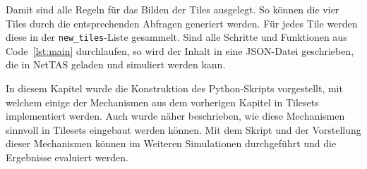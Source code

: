 Damit sind alle Regeln für das Bilden der Tiles ausgelegt. So können die vier Tiles durch die entsprechenden Abfragen generiert werden. Für jedes Tile werden diese in der \texttt{new\_tiles}-Liste gesammelt. Sind alle Schritte und Funktionen aus Code~\ref{lst:main} durchlaufen, so wird der Inhalt in eine JSON-Datei geschrieben, die in NetTAS geladen und simuliert werden kann. 

In diesem Kapitel wurde die Konstruktion des Python-Skripts vorgestellt, mit welchem einige der Mechanismen aus dem vorherigen Kapitel in Tilesets implementiert werden. Auch wurde näher beschrieben, wie diese Mechanismen sinnvoll in Tilesets eingebaut werden können. Mit dem Skript und der Vorstellung dieser Mechanismen können im Weiteren Simulationen durchgeführt und die Ergebnisse evaluiert werden.